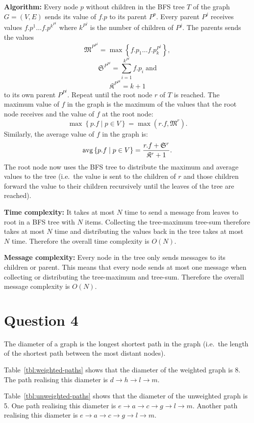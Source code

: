 \documentclass[a4paper,onecolumn,oneside]{article}
\DeclareMathOperator{\avg}{avg}
\begin{document}
\textbf{Algorithm:}  Every node $p$ without children in the BFS tree $T$ of the
graph $G=(V,E)$ sends its value of $f.p$ to its parent $P^p$.  Every parent
$P^j$
receives values
$f.p^1\ldots f.p^{k^{P^j}}$ where $k^{P^j}$ is the number of children of $P^j$.
The parents sends the values
$$\mathfrak{M}^{P^{P^j}} = \max\left\{f.p_1\ldots f.p_k^{P^j}\right\},$$
$$\mathfrak{S}^{P^{P^j}} = \sum\limits_{i=1}^{k^{P^j}} f.p_i\;\mathrm{and}$$
$$\mathfrak{K}^{P^{P^j}} = k + 1$$
to its own parent $P^{P^j}$.
Repeat until the root node $r$ of $T$ is reached.  The maximum value of $f$ in
the graph is the maximum of the values that the root node receives and the value
of $f$ at the root node:
$$\max\left\{p.f \mid p \in V\right\} = \max(r.f, \mathfrak{M}^r).$$
Similarly, the average value
of $f$ in the graph is:
$$\avg\left\{p.f \mid p \in V\right\} = {r.f + \mathfrak{S}^r \over \mathfrak{K}^r + 1}.$$
The root node now uses the BFS tree to distribute the maximum and average values
to the tree (i.e.\ the value is sent to the children of $r$ and those children
forward the value to their children recursively until the leaves of the tree are
reached).

\textbf{Time complexity:}  It takes at most $N$ time to send a message from
leaves to root in a BFS tree with $N$ items.  Collecting the tree-maximum
tree-sum therefore takes at most $N$ time and distributing the values back in
the tree takes at most $N$ time.  Therefore the overall time complexity is
$O(N)$.

\textbf{Message complexity:}  Every node in the tree only sends messages to its
children or parent.  This means that every node sends at most one message when
collecting or distributing the tree-maximum and tree-sum.  Therefore the overall
message complexity is $O(N)$.

\section*{Question 4}

The diameter of a graph is the longest shortest path in the graph (i.e.\ the
length of the shortest path between the most distant nodes).

Table~\ref{tbl:weighted-paths} shows that the diameter of the weighted graph is
8.  The path realising this diameter is $d\rightarrow h\rightarrow l\rightarrow
m$.

Table~\ref{tbl:unweighted-paths} shows that the diameter of the unweighted graph
is 5.  One path realising this diameter is $e\rightarrow a\rightarrow
c\rightarrow g\rightarrow l\rightarrow m$.  Another path realising this diameter
is $e\rightarrow a\rightarrow c\rightarrow g\rightarrow l\rightarrow m$.
\end{document}

